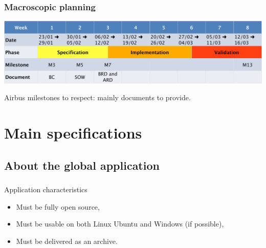 \documentclass{beamer}
\begin{document}
\begin{frame}
	\frametitle{Macroscopic planning}

    \begin{center}
		\includegraphics[width=\textwidth]{planning}	
	\end{center}
	
		Airbus milestones to respect: mainly documents to provide.
	
\end{frame}



\section{Main specifications}

\subsection{About the global application}
\begin{frame}
	\frametitle{}
	 \begin{block}{Application characteristics}
		\begin{itemize}
			\item Must be fully open source,
			\item Must be usable on both Linux Ubuntu and Windows (if possible),
			\item Must be delivered as an archive.
		\end{itemize}
    \end{block}
\end{frame}
    
\end{document}
